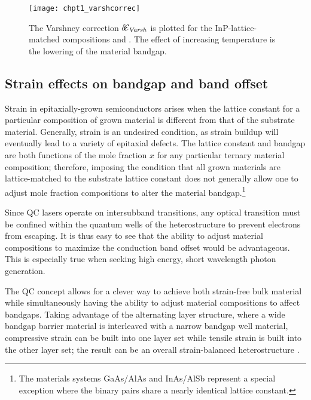 {\begin{figure}[tp]
\centering
\texttt{[image: chpt1\_varshcorrec]}
\caption[Bandgap temperature dependence]{  The Varshney correction $\delta\!\EE_\tn{\textit{Varsh}}$ is plotted for the InP-lattice-matched compositions \InGaAs and \AlInAs.  The effect of increasing temperature is the lowering of the material bandgap.}
\label{chpt1:varsh_correc}
\end{figure}

\subsection{Strain effects on bandgap and band offset}

Strain in epitaxially-grown semiconductors arises when the lattice constant for a particular composition of grown material is different from that of the substrate material.  Generally, strain is an undesired condition, as strain buildup will eventually lead to a variety of epitaxial defects.  The lattice constant and bandgap are both functions of the mole fraction $x$ for any particular ternary material composition; therefore, imposing the condition that all grown materials are lattice-matched to the substrate lattice constant does not generally allow one to adjust mole fraction compositions to alter the material bandgap.\footnote{The materials systems GaAs/AlAs and InAs/AlSb represent a special exception where the binary pairs share a nearly identical lattice constant.}

Since QC lasers operate on intersubband transitions, any optical transition must be confined within the quantum wells of the heterostructure to prevent electrons from escaping.  It is thus easy to see that the ability to adjust material compositions to maximize the conduction band offset would be advantageous. This is especially true when seeking high energy, short wavelength photon generation.

The QC concept allows for a clever way to achieve both strain-free bulk material while simultaneously having the ability to adjust material compositions to affect bandgaps.  Taking advantage of the alternating layer structure, where a wide bandgap barrier material is interleaved with a narrow bandgap well material, compressive strain can be built into one layer set while tensile strain is built into the other layer set; the result can be an overall strain-balanced heterostructure \cite{Faist:APL:1998:short}.

}

